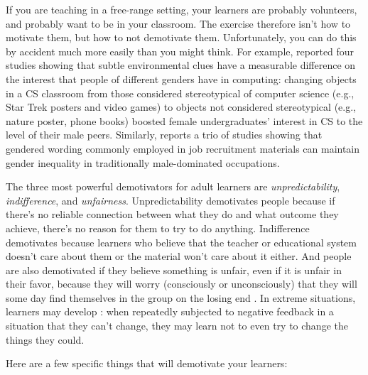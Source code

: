 If you are teaching in a free-range setting, your learners are
probably volunteers, and probably want to be in your classroom. The
exercise therefore isn't how to motivate them, but how to not
demotivate them.  Unfortunately, you can do this by accident much more
easily than you might think.  For example, \cite{Cher2009} reported
four studies showing that subtle environmental clues have a measurable
difference on the interest that people of different genders have in
computing: changing objects in a CS classroom from those considered
stereotypical of computer science (e.g., Star Trek posters and video
games) to objects not considered stereotypical (e.g., nature poster,
phone books) boosted female undergraduates' interest in CS to the
level of their male peers.  Similarly, \cite{Gauc2011} reports a trio
of studies showing that gendered wording commonly employed in job
recruitment materials can maintain gender inequality in traditionally
male-dominated occupations.

The three most powerful demotivators for adult learners are
\emph{unpredictability}, \emph{indifference}, and \emph{unfairness}.
Unpredictability demotivates people because if there's no reliable
connection between what they do and what outcome they achieve, there's
no reason for them to try to do anything. Indifference demotivates
because learners who believe that the teacher or educational system
doesn't care about them or the material won't care about it either.
And people are also demotivated if they believe something is unfair,
even if it is unfair in their favor, because they will worry
(consciously or unconsciously) that they will some day find themselves
in the group on the losing end \cite{Wilk2011}.  In extreme
situations, learners may develop
: when
repeatedly subjected to negative feedback in a situation that they
can't change, they may learn not to even try to change the things they
could.

Here are a few specific things that will demotivate your learners:

